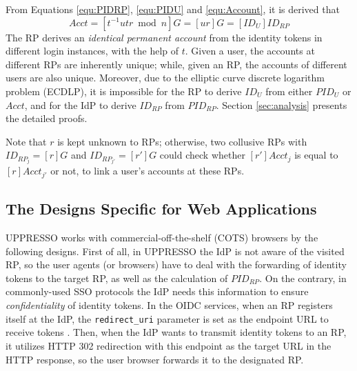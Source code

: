 From Equations \ref{equ:PIDRP}, \ref{equ:PIDU} and \ref{equ:Account}, it is derived that
\begin{equation*}
   Acct =  [t^{-1}utr \bmod n]G = [ur]G = [ID_U]ID_{RP}
   \label{equ:AccountNotChanged}
\end{equation*}
The RP derives an \emph{identical permanent account} from the identity tokens in different login instances,
    with the help of $t$. %
Given a user, the accounts at different RPs are inherently unique;
while, given an RP, the accounts of different users are also unique.
Moreover,
    due to the elliptic curve discrete logarithm problem (ECDLP),
it is impossible for the RP to derive $ID_U$ from either $PID_U$ or $Acct$,
    and for the IdP to derive $ID_{RP}$ from $PID_{RP}$.
Section \ref{sec:analysis} presents the detailed proofs.

Note that $r$ is kept unknown to RPs; otherwise, two collusive RPs with $ID_{RP_j} = [r]G$ and $ID_{RP_{j'}} = [r']G$ could check whether $[r']Acct_j$ is equal to $[r]Acct_{j'}$ or not,
    to link a user's accounts at these RPs.

\subsection{The Designs Specific for Web Applications}
\label{sec:web-design}
UPPRESSO works with commercial-off-the-shelf (COTS) browsers by the following designs.
%
First of all, in UPPRESSO the IdP is not aware of the visited RP,
 so the user agents (or browsers) have to deal with the forwarding of identity tokens
    to the target RP, as well as the calculation of $PID_{RP}$.
On the contrary,
    in commonly-used SSO protocols the IdP needs this information to ensure \emph{confidentiality} of identity tokens.
In the OIDC services, when an RP registers itself at the IdP, the \verb+redirect_uri+ parameter
    is set as the endpoint URL to receive tokens  \cite{OpenIDConnect}.
Then, %
 when the IdP wants to transmit identity tokens to an RP,
    it utilizes HTTP 302 redirection with this endpoint as the target URL in the HTTP response,
     so the user browser forwards it to the designated RP.

